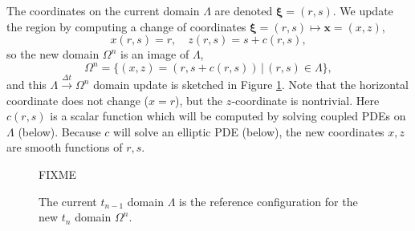 \documentclass[letterpaper,final,12pt,reqno]{amsart}
\newcommand{\bx}{\mathbf{x}}
\begin{document}
The coordinates on the current domain $\Lambda$ are denoted $\bm{\xi}=(r,s)$.  We update the region by computing a change of coordinates $\bm{\xi} = (r,s) \mapsto \bx = (x,z)$,
\begin{equation}
x(r,s)=r, \quad z(r,s)=s+c(r,s), \label{changecoords}
\end{equation}
so the new domain $\Omega^n$ is an image of $\Lambda$,
\begin{equation}
\Omega^n = \{(x,z)=(r,s+c(r,s)) \,\big|\, (r,s) \in \Lambda\}, \label{updateddomain}
\end{equation}
and this $\Lambda \stackrel{\Delta t}{\to} \Omega^n$ domain update is sketched in Figure \ref{fig:domainupdate}.  Note that the horizontal coordinate does not change ($x=r$), but the $z$-coordinate is nontrivial.  Here $c(r,s)$ is a scalar function which will be computed by solving coupled PDEs on $\Lambda$ (below).  Because $c$ will solve an elliptic PDE (below), the new coordinates $x,z$ are smooth functions of $r,s$.

\begin{figure}[h]
FIXME

\caption{The current $t_{n-1}$ domain $\Lambda$ is the reference configuration for the new $t_n$ domain $\Omega^n$.}
\label{fig:domainupdate}
\end{figure}
\end{document}
